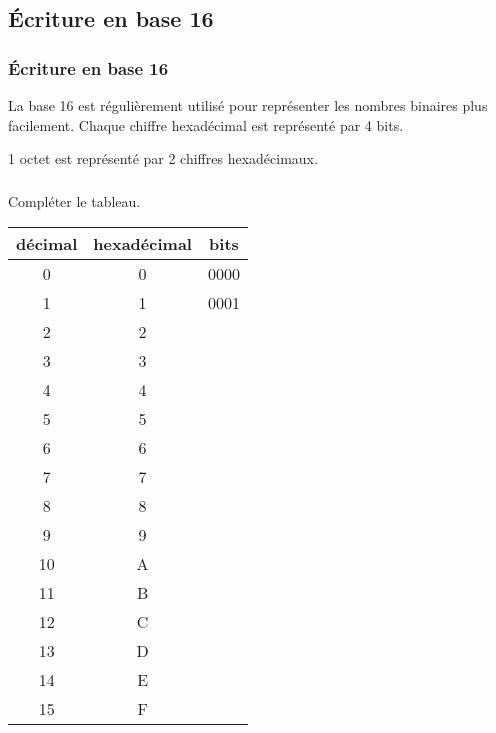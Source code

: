 \documentclass[svgnames,11pt]{beamer}
\begin{document}
\subsection{Écriture en base 16}
\begin{frame}
    \frametitle{Écriture en base 16}

    La base 16 est régulièrement utilisé pour représenter les nombres binaires plus facilement. Chaque chiffre hexadécimal est représenté par 4 bits.
    \begin{aretenir}[]
    1 octet est représenté par 2 chiffres hexadécimaux.
    \end{aretenir}

\end{frame}
\begin{frame}
    \frametitle{}

    \begin{activite}
        Compléter le tableau.
        \begin{center}{\small
            \begin{tabular}{|c|c|c|}
            \hline 
            décimal&hexadécimal & bits \\ 
            \hline 
            0&0 & 0000 \\ 
            \hline 
            1&1 & 0001 \\ 
            \hline 
            2&2 &  \\ 
            \hline 
            3&3 &  \\ 
            \hline 
            4&4 &  \\ 
            \hline 
            5&5 &  \\ 
            \hline 
            6&6 &  \\ 
            \hline 
            7&7 &  \\ 
            \hline 
            8&8 &  \\ 
            \hline 
            9&9 &  \\ 
            \hline 
            10&A &  \\ 
            \hline 
            11&B &  \\ 
            \hline 
            12&C &  \\ 
            \hline 
            13&D &  \\ 
            \hline 
            14&E &  \\ 
            \hline 
            15&F &  \\ 
            \hline 
            \end{tabular} }
            \end{center}
    \end{activite}

\end{frame}
\end{document}
